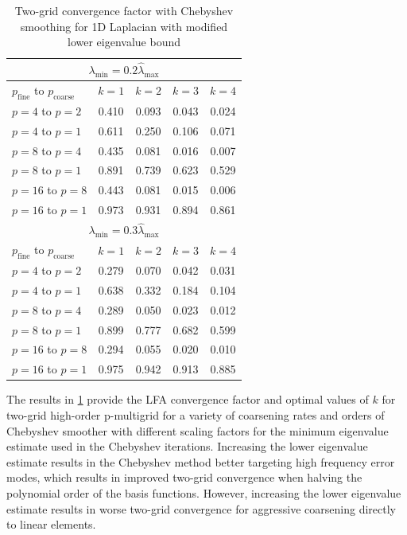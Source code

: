 \documentclass[review]{siamart190516}
\begin{document}
\begin{table}[ht!]
\begin{center}
\begin{tabular}{l c c c c}
  \toprule
  \multicolumn{5}{c}{$\lambda_{\min} = 0.2 \hat{\lambda}_{\max}$} \\
  \toprule
  $p_{\text{fine}}$ to $p_{\text{coarse}}$  &  $k = 1$   &  $k = 2$   &  $k = 3$   &  $k = 4$   \\
  \toprule
  $p = 4$ to $p = 2$   &  0.410  &  0.093  &  0.043  &  0.024  \\
  $p = 4$ to $p = 1$   &  0.611  &  0.250  &  0.106  &  0.071  \\
  \midrule
  $p = 8$ to $p = 4$   &  0.435  &  0.081  &  0.016  &  0.007  \\
  $p = 8$ to $p = 1$   &  0.891  &  0.739  &  0.623  &  0.529  \\
  \midrule
  $p = 16$ to $p = 8$  &  0.443  &  0.081  &  0.015  &  0.006  \\
  $p = 16$ to $p = 1$  &  0.973  &  0.931  &  0.894  &  0.861  \\
  \toprule
  \multicolumn{5}{c}{$\lambda_{\min} = 0.3 \hat{\lambda}_{\max}$} \\
  \toprule
  $p_{\text{fine}}$ to $p_{\text{coarse}}$  &  $k = 1$   &  $k = 2$   &  $k = 3$   &  $k = 4$   \\
  \toprule
  $p = 4$ to $p = 2$   &  0.279  &  0.070  &  0.042  &  0.031  \\
  $p = 4$ to $p = 1$   &  0.638  &  0.332  &  0.184  &  0.104  \\
  \midrule
  $p = 8$ to $p = 4$   &  0.289  &  0.050  &  0.023  &  0.012  \\
  $p = 8$ to $p = 1$   &  0.899  &  0.777  &  0.682  &  0.599  \\
  \midrule
  $p = 16$ to $p = 8$  &  0.294  &  0.055  &  0.020  &  0.010  \\
  $p = 16$ to $p = 1$  &  0.975  &  0.942  &  0.913  &  0.885  \\
  \bottomrule
\end{tabular}
\end{center}
\caption{Two-grid convergence factor with Chebyshev smoothing for 1D Laplacian with modified lower eigenvalue bound}
\label{table:two_grid_1d_chebyshev_eigenvalues}
\end{table}

The results in \cref{table:two_grid_1d_chebyshev_eigenvalues} provide the LFA convergence factor and optimal values of $k$ for two-grid high-order p-multigrid for a variety of coarsening rates and orders of Chebyshev smoother with different scaling factors for the minimum eigenvalue estimate used in the Chebyshev iterations.
Increasing the lower eigenvalue estimate results in the Chebyshev method better targeting high frequency error modes, which results in improved two-grid convergence when halving the polynomial order of the basis functions.
However, increasing the lower eigenvalue estimate results in worse two-grid convergence for aggressive coarsening directly to linear elements.
\end{document}
